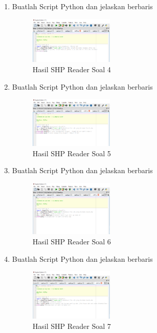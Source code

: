 \begin{enumerate}
    \item Buatlah Script Python dan jelaskan berbaris
    
    \hfill\break
    \begin{figure}[H]
		\includegraphics[width=4cm]{figures/1174017/3/soal4.PNG}
		\centering
		\caption{Hasil SHP Reader Soal 4}
    \end{figure}
    
    \item Buatlah Script Python dan jelaskan berbaris
    
    \hfill\break
    \begin{figure}[H]
		\includegraphics[width=4cm]{figures/1174017/3/soal5.PNG}
		\centering
		\caption{Hasil SHP Reader Soal 5}
    \end{figure}
  
    \item Buatlah Script Python dan jelaskan berbaris
    
    \hfill\break
    \begin{figure}[H]
		\includegraphics[width=4cm]{figures/1174017/3/soal6.PNG}
		\centering
		\caption{Hasil SHP Reader Soal 6}
    \end{figure}

    \item Buatlah Script Python dan jelaskan berbaris
    
    \hfill\break
    \begin{figure}[H]
		\includegraphics[width=4cm]{figures/1174017/3/soal7.PNG}
		\centering
		\caption{Hasil SHP Reader Soal 7}
    \end{figure}


\end{enumerate}
